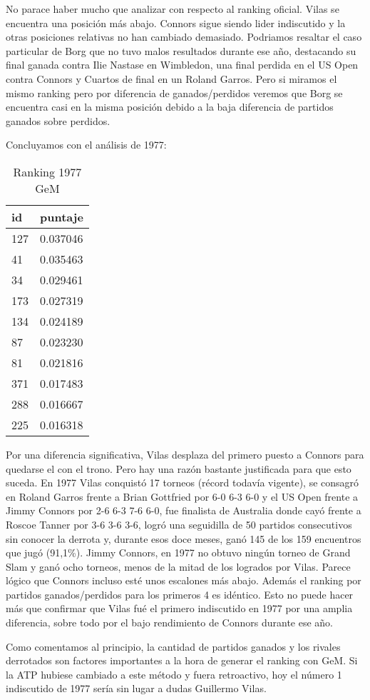 No parace haber mucho que analizar con respecto al ranking oficial. Vilas se encuentra una posición más abajo. Connors sigue siendo lider indiscutido y la otras posiciones relativas no han cambiado demasiado. Podriamos resaltar el caso particular de Borg que no tuvo malos resultados durante ese año, destacando su final ganada contra Ilie Nastase en Wimbledon, una final perdida en el US Open contra Connors y Cuartos de final en un Roland Garros. Pero si miramos el mismo ranking pero por diferencia de ganados/perdidos veremos que Borg se encuentra casi en la misma posición debido a la baja diferencia de partidos ganados sobre perdidos.

Concluyamos con el análisis de 1977: 

\begin{table}[H]
\label{my-label}
\begin{tabular}{ll}
\hline
id  & puntaje \\ \hline
127 & 0.037046 \\
41  & 0.035463 \\
34  & 0.029461 \\
173 & 0.027319 \\
134 & 0.024189 \\
87  & 0.023230 \\
81  & 0.021816 \\
371 & 0.017483 \\
288 & 0.016667 \\
225 & 0.016318 \\ \hline 
\end{tabular}
\centering
\caption{Ranking 1977 GeM}
\end{table}

Por una diferencia significativa, Vilas desplaza del primero puesto a Connors para quedarse el con el trono. Pero hay una razón bastante justificada para que esto suceda.
En 1977 Vilas conquistó 17 torneos (récord todavía vigente), se consagró en Roland Garros frente a Brian Gottfried por 6-0 6-3 6-0 y el US Open frente a Jimmy Connors por 2-6 6-3 7-6 6-0, fue finalista de Australia donde cayó frente a Roscoe Tanner por 3-6 3-6 3-6, logró una seguidilla de 50 partidos consecutivos sin conocer la derrota y, durante esos doce meses, ganó 145 de los 159 encuentros que jugó (91,1\%).
Jimmy Connors, en 1977 no obtuvo ningún torneo de Grand Slam y ganó ocho torneos, menos de la mitad de los logrados por Vilas. 
Parece lógico que Connors incluso esté unos escalones más abajo. Además el ranking por partidos ganados/perdidos para los primeros 4 es idéntico. Esto no puede hacer más que confirmar que Vilas fué el primero indiscutido en 1977 por una amplia diferencia, sobre todo por el bajo rendimiento de Connors durante ese año.

Como comentamos al principio, la cantidad de partidos ganados y los rivales derrotados son factores importantes a la hora de generar el ranking con GeM. Si la ATP hubiese cambiado a este método y fuera retroactivo, hoy el número 1 indiscutido de 1977 sería sin lugar a dudas Guillermo Vilas.

